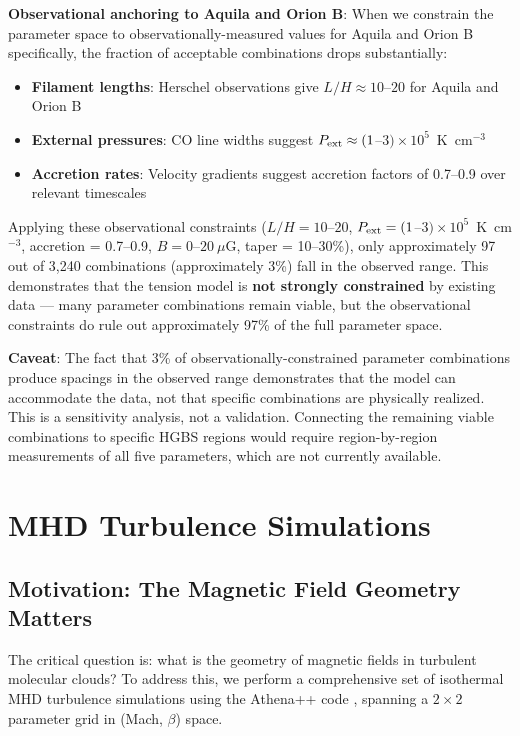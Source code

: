 \documentclass[11pt,a4paper]{article}
\begin{document}
\textbf{Observational anchoring to Aquila and Orion B}: When we constrain the parameter space to observationally-measured values for Aquila and Orion B specifically, the fraction of acceptable combinations drops substantially:
\begin{itemize}
    \item \textbf{Filament lengths}: Herschel observations give $L/H \approx 10$--$20$ for Aquila and Orion B \citep{Arzoumanian2011}
    \item \textbf{External pressures}: CO line widths suggest $P_{\rm ext} \approx (1$--$3) \times 10^5$~K~cm$^{-3}$ \citep{Fischera2012}
    \item \textbf{Accretion rates}: Velocity gradients suggest accretion factors of 0.7--0.9 over relevant timescales \citep{Heitsch2013}
\end{itemize}

Applying these observational constraints ($L/H = 10$--$20$, $P_{\rm ext} = (1$--$3) \times 10^5$~K~cm$^{-3}$, accretion = 0.7--0.9, $B = 0$--$20~\mu$G, taper = 10--30\%), only approximately 97 out of 3,240 combinations (approximately 3\%) fall in the observed range. This demonstrates that the tension model is \textbf{not strongly constrained} by existing data — many parameter combinations remain viable, but the observational constraints do rule out approximately 97\% of the full parameter space.

\textbf{Caveat}: The fact that 3\% of observationally-constrained parameter combinations produce spacings in the observed range demonstrates that the model can accommodate the data, not that specific combinations are physically realized. This is a sensitivity analysis, not a validation. Connecting the remaining viable combinations to specific HGBS regions would require region-by-region measurements of all five parameters, which are not currently available.

\section{MHD Turbulence Simulations}
\label{sec:mhd}

\subsection{Motivation: The Magnetic Field Geometry Matters}

The critical question is: what is the geometry of magnetic fields in turbulent molecular clouds? To address this, we perform a comprehensive set of isothermal MHD turbulence simulations using the Athena++ code \citep{Stone2020}, spanning a $2\times2$ parameter grid in (Mach, $\beta$) space.
\end{document}
